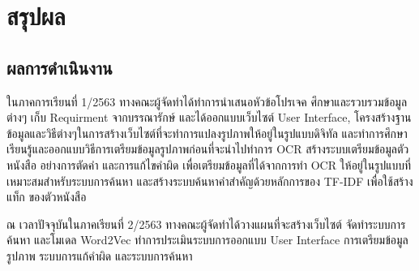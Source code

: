 \chapter{สรุปผล}

\section{ผลการดำเนินงาน}
ในภาคการเรียนที่ 1/2563 ทางคณะผู้จัดทำได้ทำการนำเสนอหัวข้อโปรเจค ศึกษาและรวบรวมข้อมูลต่างๆ เก็บ Requirment จากบรรณารักษ์ และได้ออกแบบเว็บไซต์ User Interface, 
โครงสร้างฐานข้อมูลและวิธีต่างๆในการสร้างเว็บไซต์ที่จะทำการแปลงรูปภาพให้อยู่ในรูปแบบดิจิทัล 
และทำการศึกษา เรียนรู้และออกแบบวิธีการเตรียมข้อมูลรูปภาพก่อนที่จะนำไปทำการ OCR สร้างระบบเตรียมข้อมูลตัวหนังสือ อย่างการตัดคำ และการแก้ไขคำผิด เพื่อเตรียมข้อมูลที่ได้จากการทำ OCR 
ให้อยู่ในรูปแบบที่เหมาะสมสำหรับระบบการค้นหา และสร้างระบบค้นหาคำสำคัญด้วยหลักการของ TF-IDF เพื่อใช้สร้างแท็ก ของตัวหนังสือ

ณ เวลาปัจจุบันในภาคเรียนที่ 2/2563 ทางคณะผู้จัดทำได้วางแผนที่จะสร้างเว็บไซต์ จัดทำระบบการค้นหา และโมเดล Word2Vec ทำการประเมินระบบการออกแบบ
 User Interface การเตรียมข้อมูลรูปภาพ ระบบการแก้คำผิด และระบบการค้นหา 

